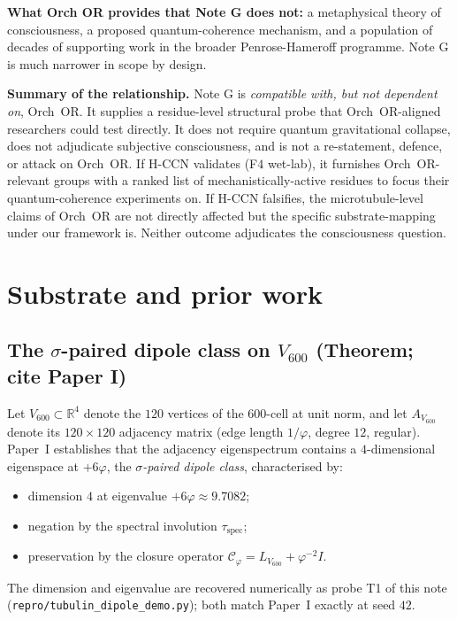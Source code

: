 \documentclass[11pt,a4paper]{article}
\begin{document}
\textbf{What Orch OR provides that Note G does not:} a metaphysical theory
of consciousness, a proposed quantum-coherence mechanism, and a population
of decades of supporting work in the broader Penrose-Hameroff programme.
Note G is much narrower in scope by design.

\textbf{Summary of the relationship.}
Note G is \emph{compatible with, but not dependent on}, Orch~OR.
It supplies a residue-level structural probe that Orch~OR-aligned
researchers could test directly. It does not require quantum
gravitational collapse, does not adjudicate subjective consciousness,
and is not a re-statement, defence, or attack on Orch~OR. If H-CCN
validates (F$4$ wet-lab), it furnishes Orch~OR-relevant groups with
a ranked list of mechanistically-active residues to focus their
quantum-coherence experiments on. If H-CCN falsifies, the
microtubule-level claims of Orch~OR are not directly affected but the
specific substrate-mapping under our framework is. Neither outcome
adjudicates the consciousness question.

\section{Substrate and prior work}

\subsection{The $\sigma$-paired dipole class on $V_{600}$ (Theorem; cite Paper I)}

Let $V_{600} \subset \mathbb{R}^4$ denote the $120$ vertices of the
$600$-cell at unit norm, and let $A_{V_{600}}$ denote its $120 \times 120$
adjacency matrix (edge length $1/\varphi$, degree $12$, regular). Paper~I
\cite{SmartExistenceClosure} establishes that the adjacency eigenspectrum
contains a $4$-dimensional eigenspace at $+6\varphi$, the
\emph{$\sigma$-paired dipole class}, characterised by:
\begin{itemize}\itemsep0pt
  \item dimension $4$ at eigenvalue $+6\varphi \approx 9.7082$;
  \item negation by the spectral involution $\tau_{\mathrm{spec}}$;
  \item preservation by the closure operator $\mathcal{C}_\varphi = L_{V_{600}} + \varphi^{-2} I$.
\end{itemize}
The dimension and eigenvalue are recovered numerically as probe \textsf{T1}
of this note (\texttt{repro/tubulin\_dipole\_demo.py}); both match Paper~I
exactly at seed $42$.
\end{document}
